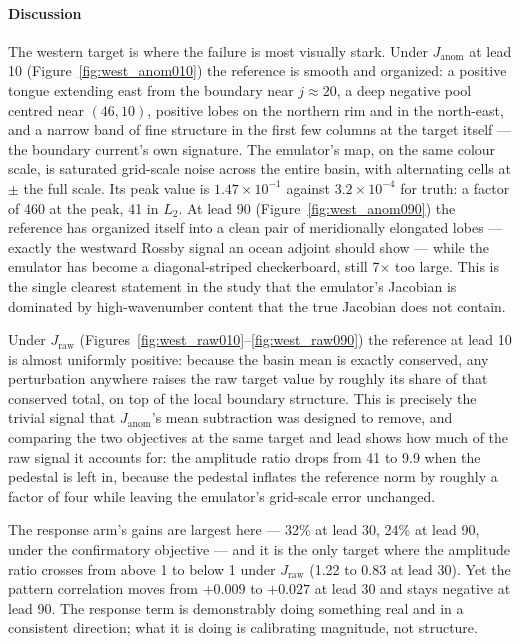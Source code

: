\documentclass[3p,12pt]{elsarticle}
\begin{document}
\paragraph{Discussion} The western target is where the failure is most visually
stark. Under $J_{\mathrm{anom}}$ at lead 10 (Figure~\ref{fig:west_anom010}) the
reference is smooth and organized: a positive tongue extending east from the
boundary near $j\approx20$, a deep negative pool centred near $(46,10)$, positive
lobes on the northern rim and in the north-east, and a narrow band of
fine structure in the first few columns at the target itself --- the boundary
current's own signature. The emulator's map, on the same colour scale, is
saturated grid-scale noise across the entire basin, with alternating cells at
$\pm$ the full scale. Its peak value is $1.47\times10^{-1}$ against
$3.2\times10^{-4}$ for truth: a factor of 460 at the peak, 41 in $L_2$.
At lead 90 (Figure~\ref{fig:west_anom090}) the reference has organized itself
into a clean pair of meridionally elongated lobes --- exactly the westward Rossby
signal an ocean adjoint should show --- while the emulator has become a
diagonal-striped checkerboard, still 7$\times$ too large. This is the single
clearest statement in the study that the emulator's Jacobian is dominated by
high-wavenumber content that the true Jacobian does not contain.

Under $J_{\mathrm{raw}}$ (Figures~\ref{fig:west_raw010}--\ref{fig:west_raw090})
the reference at lead 10 is almost uniformly positive: because the basin mean is
exactly conserved, any perturbation anywhere raises the raw target value by
roughly its share of that conserved total, on top of the local boundary
structure. This is precisely the trivial signal that $J_{\mathrm{anom}}$'s mean
subtraction was designed to remove, and comparing the two objectives at the same
target and lead shows how much of the raw signal it accounts for: the amplitude
ratio drops from 41 to 9.9 when the pedestal is left in, because the pedestal
inflates the reference norm by roughly a factor of four while leaving the
emulator's grid-scale error unchanged.

The response arm's gains are largest here --- 32\% at lead 30, 24\% at lead 90,
under the confirmatory objective --- and it is the only target where the
amplitude ratio crosses from above 1 to below 1 under $J_{\mathrm{raw}}$
(1.22 to 0.83 at lead 30). Yet the pattern correlation moves from $+0.009$ to
$+0.027$ at lead 30 and stays negative at lead 90. The response term is
demonstrably doing something real and in a consistent direction; what it is
doing is calibrating magnitude, not structure.
\end{document}
